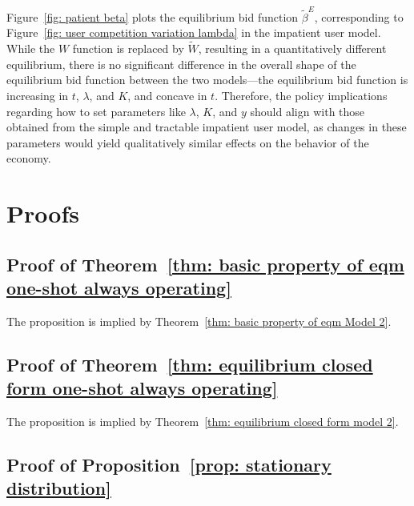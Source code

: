 \documentclass[12pt, letterpaper]{article}
\begin{document}
Figure~\ref{fig: patient beta} plots the equilibrium bid function $\tilde{\beta}^E$, corresponding to Figure~\ref{fig: user competition variation lambda} in the impatient user model. While the $W$ function is replaced by $\tilde{W}$, resulting in a quantitatively different equilibrium, there is no significant difference in the overall shape of the equilibrium bid function between the two models---the equilibrium bid function is increasing in $t$, $\lambda$, and $K$, and concave in $t$. Therefore, the policy implications regarding how to set parameters like $\lambda$, $K$, and $y$ should align with those obtained from the simple and tractable impatient user model, as changes in these parameters would yield qualitatively similar effects on the behavior of the economy.






\section{Proofs}\label{sec: proofs}

\subsection{Proof of Theorem~\ref{thm: basic property of eqm one-shot always operating}}\label{subsec: basic property of eqm one-shot always operating}

The proposition is implied by Theorem~\ref{thm: basic property of eqm Model 2}.

\subsection{Proof of Theorem~\ref{thm: equilibrium closed form one-shot always operating}}\label{subsec: equilibrium closed form one-shot always operating}

The proposition is implied by Theorem~\ref{thm: equilibrium closed form model 2}.


\subsection{Proof of Proposition~\ref{prop: stationary distribution}}
\end{document}
